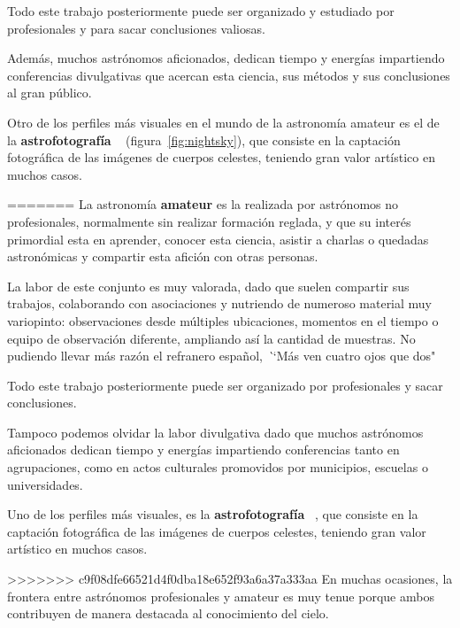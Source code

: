 \begin{itemize}
\begin{itemize}
Todo este trabajo posteriormente puede ser organizado y estudiado por profesionales y para sacar conclusiones valiosas.


Además, muchos astrónomos aficionados, dedican tiempo y energías impartiendo conferencias divulgativas que acercan esta ciencia, sus métodos y sus conclusiones al gran público.


Otro de los perfiles más visuales en el mundo de la astronomía amateur es el de la \textbf{astrofotografía} ~\cite{AstroFoto} (figura~\ref{fig:nightsky}), que consiste en la captación fotográfica de las imágenes de cuerpos celestes, teniendo gran valor artístico en muchos casos.


=======
La astronomía \textbf{amateur} es la realizada por astrónomos no profesionales, normalmente sin realizar formación reglada, y que su interés primordial esta en aprender, conocer esta ciencia, asistir a charlas o quedadas astronómicas y compartir esta afición con otras personas.

\bigskip
La labor de este conjunto es muy valorada, dado que suelen compartir sus trabajos, colaborando con asociaciones  y nutriendo de numeroso material muy variopinto: observaciones desde múltiples ubicaciones, momentos en el tiempo o equipo de observación diferente, ampliando así la cantidad de muestras. No pudiendo llevar más razón el refranero español, \textit``Más ven cuatro ojos que dos"

\bigskip
Todo este trabajo posteriormente puede ser organizado por profesionales y sacar conclusiones.

\bigskip
Tampoco podemos olvidar la labor divulgativa dado que muchos astrónomos aficionados dedican tiempo y energías impartiendo conferencias tanto en agrupaciones, como en actos culturales promovidos por municipios, escuelas o universidades. 

\bigskip
Uno de los perfiles más visuales, es  la \textbf{astrofotografía} ~\cite{AstroFoto}, que consiste  en la captación fotográfica de las imágenes de  cuerpos celestes, teniendo gran valor artístico en muchos casos.

\bigskip
>>>>>>> c9f08dfe66521d4f0dba18e652f93a6a37a333aa
En muchas ocasiones, la frontera entre astrónomos profesionales y amateur es muy tenue porque ambos contribuyen de manera destacada al conocimiento del cielo.



\end{itemize}
\end{itemize}
